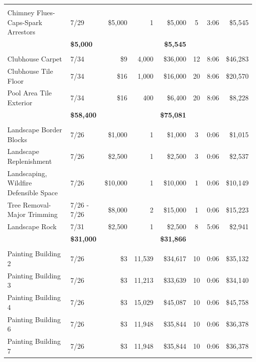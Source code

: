 \documentclass[11pt,letterpaper]{article}
\begin{document}
\begin{longtable}{p{4.2cm} p{1.6cm} r r r c c r}
\addlinespace[6pt]
\multicolumn{8}{l}{\textbf{Fire Safety}} \\
\rowcolor{blue!12} Chimney Flues-Caps-Spark Arrestors & 7/29 & \$5,000 & 1 & \$5,000 & 5 & 3:06 & \$5,545 \\
\addlinespace[1pt] \multicolumn{4}{r}{} & \textbf{\$5,000} & & & \textbf{\$5,545} \\
\addlinespace[6pt]
\multicolumn{8}{l}{\textbf{Flooring}} \\
Clubhouse Carpet & 7/34 & \$9 & 4,000 & \$36,000 & 12 & 8:06 & \$46,283 \\
\rowcolor{blue!12} Clubhouse Tile Floor & 7/34 & \$16 & 1,000 & \$16,000 & 20 & 8:06 & \$20,570 \\
Pool Area Tile Exterior & 7/34 & \$16 & 400 & \$6,400 & 20 & 8:06 & \$8,228 \\
\addlinespace[1pt] \multicolumn{4}{r}{} & \textbf{\$58,400} & & & \textbf{\$75,081} \\
\addlinespace[6pt]
\multicolumn{8}{l}{\textbf{Landscape}} \\
\rowcolor{blue!12} Landscape Border Blocks & 7/26 & \$1,000 & 1 & \$1,000 & 3 & 0:06 & \$1,015 \\
Landscape Replenishment & 7/26 & \$2,500 & 1 & \$2,500 & 3 & 0:06 & \$2,537 \\
\rowcolor{blue!12} Landscaping, Wildfire Defensible Space & 7/26 & \$10,000 & 1 & \$10,000 & 1 & 0:06 & \$10,149 \\
Tree Removal-Major Trimming & 7/26 - 7/26 & \$8,000 & 2 & \$15,000 & 1 & 0:06 & \$15,223 \\
\rowcolor{blue!12} Landscape Rock & 7/31 & \$2,500 & 1 & \$2,500 & 8 & 5:06 & \$2,941 \\
\addlinespace[1pt] \multicolumn{4}{r}{} & \textbf{\$31,000} & & & \textbf{\$31,866} \\
\addlinespace[6pt]
\multicolumn{8}{l}{\textbf{Painting}} \\
Painting Building 2 & 7/26 & \$3 & 11,539 & \$34,617 & 10 & 0:06 & \$35,132 \\
\rowcolor{blue!12} Painting Building 3 & 7/26 & \$3 & 11,213 & \$33,639 & 10 & 0:06 & \$34,140 \\
Painting Building 4 & 7/26 & \$3 & 15,029 & \$45,087 & 10 & 0:06 & \$45,758 \\
\rowcolor{blue!12} Painting Building 6 & 7/26 & \$3 & 11,948 & \$35,844 & 10 & 0:06 & \$36,378 \\
Painting Building 7 & 7/26 & \$3 & 11,948 & \$35,844 & 10 & 0:06 & \$36,378 \\

\end{longtable}
\end{document}
